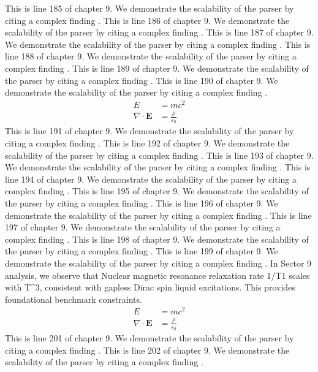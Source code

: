 This is line 185 of chapter 9. We demonstrate the scalability of the parser by citing a complex finding \cite{ref9_185}.
This is line 186 of chapter 9. We demonstrate the scalability of the parser by citing a complex finding \cite{ref9_186}.
This is line 187 of chapter 9. We demonstrate the scalability of the parser by citing a complex finding \cite{ref9_187}.
This is line 188 of chapter 9. We demonstrate the scalability of the parser by citing a complex finding \cite{ref9_188}.
This is line 189 of chapter 9. We demonstrate the scalability of the parser by citing a complex finding \cite{ref9_189}.
This is line 190 of chapter 9. We demonstrate the scalability of the parser by citing a complex finding \cite{ref9_190}.
\begin{align*}
  E &= mc^2 \\
  \nabla \cdot \mathbf{E} &= \frac{\rho}{\varepsilon_0}
\end{align*}
This is line 191 of chapter 9. We demonstrate the scalability of the parser by citing a complex finding \cite{ref9_191}.
This is line 192 of chapter 9. We demonstrate the scalability of the parser by citing a complex finding \cite{ref9_192}.
This is line 193 of chapter 9. We demonstrate the scalability of the parser by citing a complex finding \cite{ref9_193}.
This is line 194 of chapter 9. We demonstrate the scalability of the parser by citing a complex finding \cite{ref9_194}.
This is line 195 of chapter 9. We demonstrate the scalability of the parser by citing a complex finding \cite{ref9_195}.
This is line 196 of chapter 9. We demonstrate the scalability of the parser by citing a complex finding \cite{ref9_196}.
This is line 197 of chapter 9. We demonstrate the scalability of the parser by citing a complex finding \cite{ref9_197}.
This is line 198 of chapter 9. We demonstrate the scalability of the parser by citing a complex finding \cite{ref9_198}.
This is line 199 of chapter 9. We demonstrate the scalability of the parser by citing a complex finding \cite{ref9_199}.
In Sector 9 analysis, we observe that Nuclear magnetic resonance relaxation rate 1/T1 scales with T^3, consistent with gapless Dirac spin liquid excitations. This provides foundational benchmark constraints.
\begin{align*}
  E &= mc^2 \\
  \nabla \cdot \mathbf{E} &= \frac{\rho}{\varepsilon_0}
\end{align*}
This is line 201 of chapter 9. We demonstrate the scalability of the parser by citing a complex finding \cite{ref9_201}.
This is line 202 of chapter 9. We demonstrate the scalability of the parser by citing a complex finding \cite{ref9_202}.
